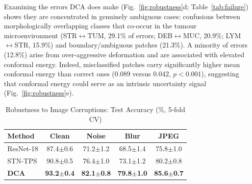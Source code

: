 Examining the errors DCA does make (Fig.~\ref{fig:robustness}d;
Table~\ref{tab:failure}) shows they are concentrated in genuinely ambiguous
cases: confusions between morphologically overlapping classes that co-occur in
the tumour microenvironment (STR$\leftrightarrow$TUM, 29.1\% of errors;
DEB$\leftrightarrow$MUC, 20.9\%; LYM$\leftrightarrow$STR, 15.9\%) and
boundary/ambiguous patches (21.3\%). A minority of errors (12.8\%) arise from
over-aggressive deformation and are associated with elevated conformal energy.
Indeed, misclassified patches carry significantly higher mean conformal energy
than correct ones (0.089 versus 0.042, $p<0.001$), suggesting that conformal
energy could serve as an intrinsic uncertainty signal
(Fig.~\ref{fig:robustness}e).

\begin{table}[t]
\centering
\caption{Robustness to Image Corruptions: Test Accuracy (\%, 5-fold CV)}
\label{tab:robustness}
\begin{tabularx}{\textwidth}{Xcccc}
\hline
\textbf{Method} & \textbf{Clean} & \textbf{Noise} & \textbf{Blur} & \textbf{JPEG} \\
\hline
ResNet-18 & 87.4$\pm$0.6 & 71.2$\pm$1.2 & 68.5$\pm$1.4 & 75.8$\pm$1.0 \\
STN-TPS & 90.8$\pm$0.5 & 76.4$\pm$1.0 & 73.1$\pm$1.2 & 80.2$\pm$0.8 \\
\textbf{DCA} & \textbf{93.2$\pm$0.4} & \textbf{82.1$\pm$0.8} & \textbf{79.8$\pm$1.0} & \textbf{85.6$\pm$0.7} \\
\hline
\end{tabularx}
\end{table}
